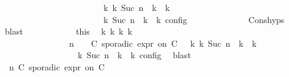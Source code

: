\begin{isabellebody}
\ \ \ \ \ \ \ \ \ \ \ \ \ \ \ \ \ \ \ \ \ \ \ \ {\isasymhookrightarrow}\isactrlbsup k\isactrlesup \ {\isacharparenleft}{\isasymGamma}\isactrlsub k{\isacharcomma}\ Suc\ n\ {\isasymturnstile}\ {\isasymPsi}\isactrlsub k\ {\isasymtriangleright}\ {\isasymPhi}\isactrlsub k{\isacharparenright}{\isacharparenright}\isanewline
\ \ \ \ \ \ \ \ \ \ \ \ \ \ \ \ \ \ \ \ {\isasymand}\ {\isasymrho}\ {\isasymin}\ {\isasymlbrakk}\ {\isasymGamma}\isactrlsub k{\isacharcomma}\ Suc\ n\ {\isasymturnstile}\ {\isasymPsi}\isactrlsub k\ {\isasymtriangleright}\ {\isasymPhi}\isactrlsub k\ {\isasymrbrakk}\isactrlsub c\isactrlsub o\isactrlsub n\isactrlsub f\isactrlsub i\isactrlsub g{\isacartoucheclose}\isanewline
\ \ \ \ \ \ \ \ \ \ \ \ \isamarkupfalse%
\ Cons{\isachardot}hyps\ \isamarkupfalse%
\ blast\isanewline
\ \ \ \ \ \ \ \ \ \ \isamarkupfalse%
\ this\ \isamarkupfalse%
\ {\isasymGamma}\isactrlsub k\ {\isasymPsi}\isactrlsub k\ {\isasymPhi}\isactrlsub k\ k\ \isanewline
\ \ \ \ \ \ \ \ \ \ \ \ \ \ \ {\isacartoucheopen}{\isacharparenleft}{\isacharparenleft}{\isasymGamma}{\isacharcomma}\ n\ {\isasymturnstile}\ {\isasymPsi}\ {\isasymtriangleright}\ {\isacharparenleft}{\isacharparenleft}C\ sporadic{\isasymsharp}\ {\isasymtau}\isactrlsub e\isactrlsub x\isactrlsub p\isactrlsub r\ on\ C\ {\isacharhash}\ {\isasymPhi}{\isacharparenright}{\isacharparenright}\ {\isasymhookrightarrow}\isactrlbsup k\isactrlesup \ {\isacharparenleft}{\isasymGamma}\isactrlsub k{\isacharcomma}\ Suc\ n\ {\isasymturnstile}\ {\isasymPsi}\isactrlsub k\ {\isasymtriangleright}\ {\isasymPhi}\isactrlsub k{\isacharparenright}{\isacharparenright}{\isacartoucheclose}\isanewline
\ \ \ \ \ \ \ \ \ \ \ \ \ \ \ {\isacharasterisk}{\isacharcolon}{\isacartoucheopen}{\isasymrho}\ {\isasymin}\ {\isasymlbrakk}\ {\isasymGamma}\isactrlsub k{\isacharcomma}\ Suc\ n\ {\isasymturnstile}\ {\isasymPsi}\isactrlsub k\ {\isasymtriangleright}\ {\isasymPhi}\isactrlsub k\ {\isasymrbrakk}\isactrlsub c\isactrlsub o\isactrlsub n\isactrlsub f\isactrlsub i\isactrlsub g{\isacartoucheclose}\ \isamarkupfalse%
\ blast\isanewline
\ \ \ \ \ \ \ \ \ \ \isamarkupfalse%
\ \isamarkupfalse%
\ {\isacartoucheopen}{\isacharparenleft}{\isasymGamma}{\isacharcomma}\ n\ {\isasymturnstile}{\isacharparenleft}{\isacharparenleft}C\ sporadic{\isasymsharp}\ {\isasymtau}\isactrlsub e\isactrlsub x\isactrlsub p\isactrlsub r\ on\ C\ {\isacharhash}\ {\isasymPsi}{\isacharparenright}\ {\isasymtriangleright}\ {\isasymPhi}{\isacharparenright}\isanewline

\end{isabellebody}
